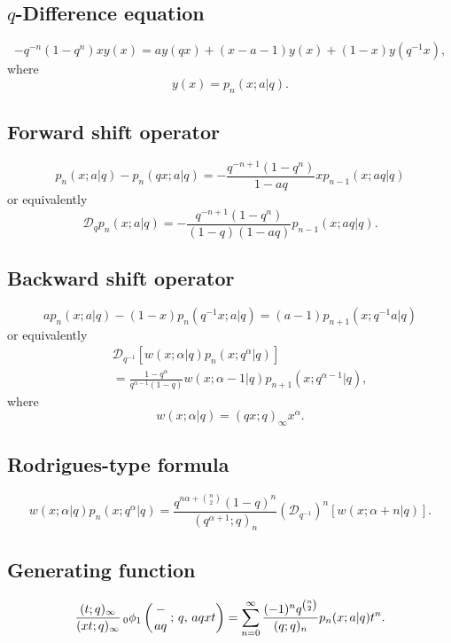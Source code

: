 \documentclass[envcountchap,graybox]{svmono}
\newcommand{\qhyp}[5]{\mbox{}_{#1}{\phi}_{#2}
\left(\genfrac{}{}{0pt}{}{#3}{#4}\,;\,q,\,#5\right)}
\newcommand{\qhyp}[5]{\,\mbox{}_{#1}\phi_{#2}\!\left(
  \genfrac{}{}{0pt}{}{#3}{#4};#5\right)}
\begin{document}
{{\subsection*{$q$-Difference equation}
\begin{equation}
\label{dvLittleqLaguerre}
-q^{-n}(1-q^n)xy(x)=ay(qx)+(x-a-1)y(x)+(1-x)y(q^{-1}x),
\end{equation}
where
$$y(x)=p_n(x;a|q).$$

\subsection*{Forward shift operator}
\begin{equation}
\label{shift1LittleqLaguerreI}
p_n(x;a|q)-p_n(qx;a|q)=-\frac{q^{-n+1}(1-q^n)}{1-aq}xp_{n-1}(x;aq|q)
\end{equation}
or equivalently
\begin{equation}
\label{shift1LittleqLaguerreII}
\mathcal{D}_qp_n(x;a|q)=-\frac{q^{-n+1}(1-q^n)}{(1-q)(1-aq)}
p_{n-1}(x;aq|q).
\end{equation}

\subsection*{Backward shift operator}
\begin{equation}
\label{shift2LittleqLaguerreI}
ap_n(x;a|q)-(1-x)p_n(q^{-1}x;a|q)=(a-1)p_{n+1}(x;q^{-1}a|q)
\end{equation}
or equivalently
\begin{eqnarray}
\label{shift2LittleqLaguerreII}
& &\mathcal{D}_{q^{-1}}\left[w(x;\alpha|q)p_n(x;q^{\alpha}|q)\right]\nonumber\\
& &{}=\frac{1-q^{\alpha}}{q^{\alpha-1}(1-q)}w(x;\alpha-1|q)p_{n+1}(x;q^{\alpha-1}|q),
\end{eqnarray}
where
$$w(x;\alpha|q)=(qx;q)_{\infty}x^{\alpha}.$$

\subsection*{Rodrigues-type formula}
\begin{equation}
\label{RodLittleqLaguerre}
w(x;\alpha|q)p_n(x;q^{\alpha}|q)=\frac{q^{n\alpha+\binom{n}{2}}(1-q)^n}
{(q^{\alpha+1};q)_n}\left(\mathcal{D}_{q^{-1}}\right)^n\left[w(x;\alpha+n|q)\right].
\end{equation}

\subsection*{Generating function}
\begin{equation}
\label{GenLittleqLaguerre}
\frac{(t;q)_{\infty}}{(xt;q)_{\infty}}\,\qhyp{0}{1}{-}{aq}{aqxt}=\sum_{n=0}^{\infty}
\frac{(-1)^nq^{\binom{n}{2}}}{(q;q)_n}p_n(x;a|q)t^n.
\end{equation}

}}
\end{document}
